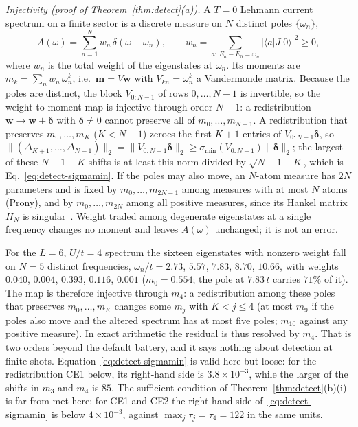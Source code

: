 \documentclass[submission, PhysCore]{SciPost}
\begin{document}
\begin{appendix}
\emph{Injectivity (proof of Theorem~\ref{thm:detect}(a)).} A $T=0$ Lehmann current spectrum on a finite sector is a discrete measure on $N$ distinct poles $\{\omega_n\}$,
\[
A(\omega)=\sum_{n=1}^{N}w_n\,\delta(\omega-\omega_n),\qquad w_n=\sum_{a:\,E_a-E_0=\omega_n}|\langle a|J|0\rangle|^2\ge0,
\]
where $w_n$ is the total weight of the eigenstates at $\omega_n$. Its moments are $m_k=\sum_n w_n\,\omega_n^{k}$, i.e.\ $\mathbf{m}=V\mathbf{w}$ with $V_{kn}=\omega_n^{k}$ a Vandermonde matrix. Because the poles are distinct, the block $V_{0:N-1}$ of rows $0,\dots,N-1$ is invertible, so the weight-to-moment map is injective through order $N-1$: a redistribution $\mathbf{w}\to\mathbf{w}+\bm{\delta}$ with $\bm{\delta}\neq0$ cannot preserve all of $m_0,\dots,m_{N-1}$. A redistribution that preserves $m_0,\dots,m_K$ ($K<N-1$) zeroes the first $K{+}1$ entries of $V_{0:N-1}\bm{\delta}$, so $\|(\Delta_{K+1},\dots,\Delta_{N-1})\|_2=\|V_{0:N-1}\bm{\delta}\|_2\ge\sigma_{\min}(V_{0:N-1})\|\bm{\delta}\|_2$; the largest of these $N{-}1{-}K$ shifts is at least this norm divided by $\sqrt{N-1-K}$, which is Eq.~\eqref{eq:detect-sigmamin}. If the poles may also move, an $N$-atom measure has $2N$ parameters and is fixed by $m_0,\dots,m_{2N-1}$ among measures with at most $N$ atoms (Prony), and by $m_0,\dots,m_{2N}$ among all positive measures, since its Hankel matrix $H_N$ is singular~\cite{ShohatTamarkin1943,PottsTasche2013}. Weight traded among degenerate eigenstates at a single frequency changes no moment and leaves $A(\omega)$ unchanged; it is not an error.

For the $L=6$, $U/t=4$ spectrum the sixteen eigenstates with nonzero weight fall on $N=5$ distinct frequencies, $\omega_n/t=2.73$, $5.57$, $7.83$, $8.70$, $10.66$, with weights $0.040$, $0.004$, $0.393$, $0.116$, $0.001$ ($m_0=0.554$; the pole at $7.83\,t$ carries $71\%$ of it). The map is therefore injective through $m_4$: a redistribution among these poles that preserves $m_0,\dots,m_K$ changes some $m_j$ with $K<j\le4$ (at most $m_9$ if the poles also move and the altered spectrum has at most five poles; $m_{10}$ against any positive measure). In exact arithmetic the residual is thus resolved by $m_4$. That is two orders beyond the default battery, and it says nothing about detection at finite shots. Equation~\eqref{eq:detect-sigmamin} is valid here but loose: for the redistribution CE1 below, its right-hand side is $3.8\times10^{-3}$, while the larger of the shifts in $m_3$ and $m_4$ is $85$. The sufficient condition of Theorem~\ref{thm:detect}(b)(i) is far from met here: for CE1 and CE2 the right-hand side of~\eqref{eq:detect-sigmamin} is below $4\times10^{-3}$, against $\max_j\tau_j=\tau_4=122$ in the same units.


\end{appendix}
\end{document}
